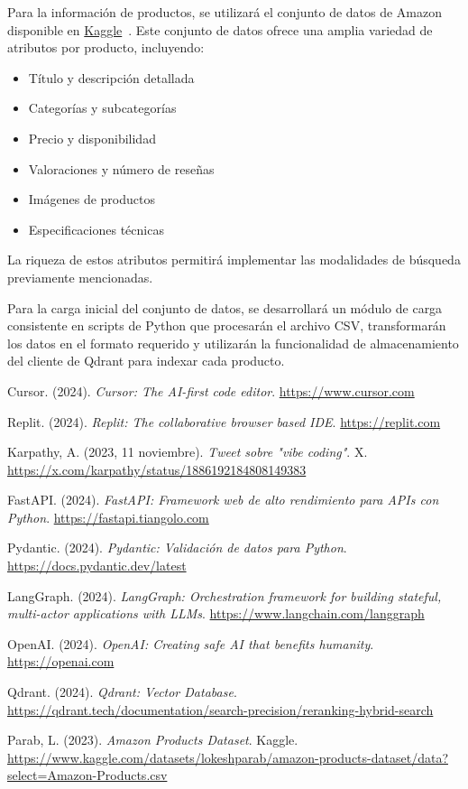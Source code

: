 \documentclass[12pt]{article}
\begin{document}
Para la información de productos, se utilizará el conjunto de datos de Amazon disponible en \href{https://www.kaggle.com/datasets/lokeshparab/amazon-products-dataset/data?select=Amazon-Products.csv}{Kaggle}~\cite{Amazon}. Este conjunto de datos ofrece una amplia variedad de atributos por producto, incluyendo:

\begin{itemize}
    \item Título y descripción detallada
    \item Categorías y subcategorías
    \item Precio y disponibilidad
    \item Valoraciones y número de reseñas
    \item Imágenes de productos
    \item Especificaciones técnicas
\end{itemize}

La riqueza de estos atributos permitirá implementar las modalidades de búsqueda previamente mencionadas.

Para la carga inicial del conjunto de datos, se desarrollará un módulo de carga consistente en scripts de Python que procesarán el archivo CSV, transformarán los datos en el formato requerido y utilizarán la funcionalidad de almacenamiento del cliente de Qdrant para indexar cada producto.

\newpage

\begin{thebibliography}{2}
    \raggedright

    Cursor. (2024). \textit{Cursor: The AI-first code editor}. \url{https://www.cursor.com}

    Replit. (2024). \textit{Replit: The collaborative browser based IDE}. \url{https://replit.com}

    Karpathy, A. (2023, 11 noviembre). \textit{Tweet sobre "vibe coding"}. X. \url{https://x.com/karpathy/status/1886192184808149383}

    FastAPI. (2024). \textit{FastAPI: Framework web de alto rendimiento para APIs con Python}. \url{https://fastapi.tiangolo.com}

    Pydantic. (2024). \textit{Pydantic: Validación de datos para Python}. \url{https://docs.pydantic.dev/latest}

    LangGraph. (2024). \textit{LangGraph: Orchestration framework for building stateful, multi-actor applications with LLMs}. \url{https://www.langchain.com/langgraph}

    OpenAI. (2024). \textit{OpenAI: Creating safe AI that benefits humanity}. \url{https://openai.com}

    Qdrant. (2024). \textit{Qdrant: Vector Database}. \url{https://qdrant.tech/documentation/search-precision/reranking-hybrid-search}

    Parab, L. (2023). \textit{Amazon Products Dataset}. Kaggle. \url{https://www.kaggle.com/datasets/lokeshparab/amazon-products-dataset/data?select=Amazon-Products.csv}

\end{thebibliography}
\end{document}
